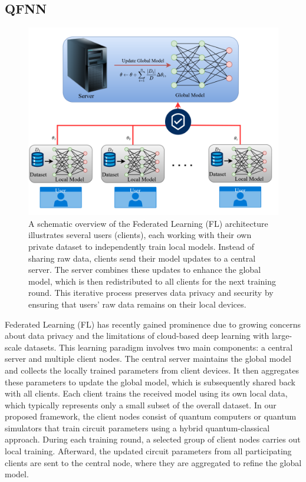 \documentclass[10pt]{article}
\begin{document}
\subsection{QFNN}
\begin{figure}[h!]
	\centering
	\includegraphics[height = 0.30\textheight]{img/FL_model.png}
	\caption{A schematic overview of the Federated Learning (FL) architecture illustrates several users (clients), each working with their own private dataset to independently train local models. Instead of sharing raw data, clients send their model updates to a central server. The server combines these updates to enhance the global model, which is then redistributed to all clients for the next training round. This iterative process preserves data privacy and security by ensuring that users' raw data remains on their local devices.}
\end{figure}
Federated Learning (FL) has recently gained prominence due to growing concerns about data privacy and the limitations of cloud-based deep learning with large-scale datasets. This learning paradigm involves two main components: a central server and multiple client nodes. The central server maintains the global model and collects the locally trained parameters from client devices. It then aggregates these parameters to update the global model, which is subsequently shared back with all clients. Each client trains the received model using its own local data, which typically represents only a small subset of the overall dataset.
In our proposed framework, the client nodes consist of quantum computers or quantum simulators that train circuit parameters using a hybrid quantum-classical approach. During each training round, a selected group of client nodes carries out local training. Afterward, the updated circuit parameters from all participating clients are sent to the central node, where they are aggregated to refine the global model.
\end{document}
